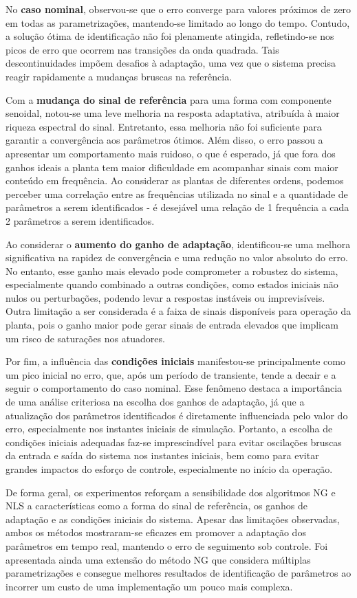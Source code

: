 \documentclass[10pt]{article}
\begin{document}
No \textbf{caso nominal}, observou-se que o erro converge para valores próximos de zero em todas as parametrizações, mantendo-se limitado ao longo do tempo. Contudo, a solução ótima de identificação não foi plenamente atingida, refletindo-se nos picos de erro que ocorrem nas transições da onda quadrada. Tais descontinuidades impõem desafios à adaptação, uma vez que o sistema precisa reagir rapidamente a mudanças bruscas na referência.

Com a \textbf{mudança do sinal de referência} para uma forma com componente senoidal, notou-se uma leve melhoria na resposta adaptativa, atribuída à maior riqueza espectral do sinal. Entretanto, essa melhoria não foi suficiente para garantir a convergência aos parâmetros ótimos. Além disso, o erro passou a apresentar um comportamento mais ruidoso, o que é esperado, já que fora dos ganhos ideais a planta tem maior dificuldade em acompanhar sinais com maior conteúdo em frequência. Ao considerar as plantas de diferentes ordens, podemos perceber uma correlação entre as frequências utilizada no sinal e a quantidade de parâmetros a serem identificados - é desejável uma relação de 1 frequência a cada 2 parâmetros a serem identificados.

Ao considerar o \textbf{aumento do ganho de adaptação}, identificou-se uma melhora significativa na rapidez de convergência e uma redução no valor absoluto do erro. No entanto, esse ganho mais elevado pode comprometer a robustez do sistema, especialmente quando combinado a outras condições, como estados iniciais não nulos ou perturbações, podendo levar a respostas instáveis ou imprevisíveis. Outra limitação a ser considerada é a faixa de sinais disponíveis para operação da planta, pois o ganho maior pode gerar sinais de entrada elevados que implicam um risco de saturações nos atuadores. 

Por fim, a influência das \textbf{condições iniciais} manifestou-se principalmente como um pico inicial no erro, que, após um período de transiente, tende a decair e a seguir o comportamento do caso nominal. Esse fenômeno destaca a importância de uma análise criteriosa na escolha dos ganhos de adaptação, já que a atualização dos parâmetros identificados é diretamente influenciada pelo valor do erro, especialmente nos instantes iniciais de simulação. Portanto, a escolha de condições iniciais adequadas faz-se imprescindível para evitar oscilações bruscas da entrada e saída do sistema nos instantes iniciais, bem como para evitar grandes impactos do esforço de controle, especialmente no início da operação.

De forma geral, os experimentos reforçam a sensibilidade dos algoritmos NG e NLS a características como a forma do sinal de referência, os ganhos de adaptação e as condições iniciais do sistema. Apesar das limitações observadas, ambos os métodos mostraram-se eficazes em promover a adaptação dos parâmetros em tempo real, mantendo o erro de seguimento sob controle. Foi apresentada ainda uma extensão do método NG que considera múltiplas parametrizações e consegue melhores resultados de identificação de parâmetros ao incorrer um custo de uma implementação um pouco mais complexa.
\end{document}
